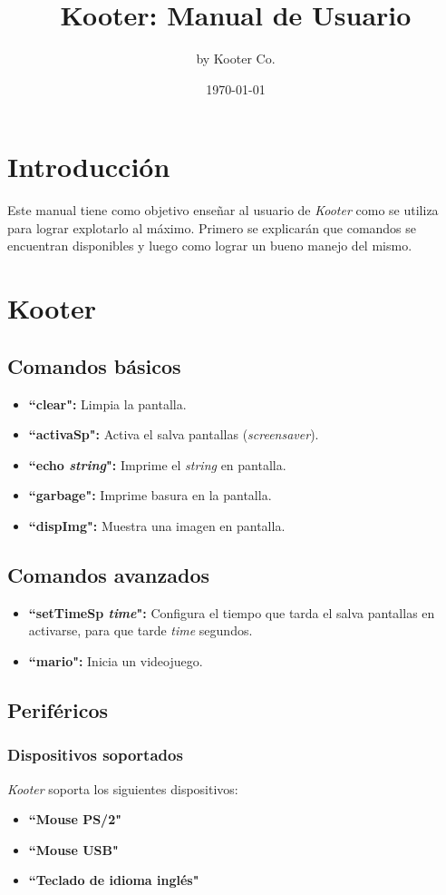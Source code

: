 \documentclass[a4paper,11pt]{article}
\title{Kooter: Manual de Usuario}
\author{by Kooter Co.}
\date{\today}
\begin{document}
\maketitle
\newpage
\tableofcontents
\newpage
\section{Introducción}
Este manual tiene como objetivo enseñar al usuario de \emph{Kooter} como se utiliza para lograr explotarlo al máximo. Primero se explicarán que comandos se encuentran disponibles y luego como lograr un bueno manejo del mismo.

\section{Kooter}
\subsection{Comandos básicos}
\begin{itemize}
	\item \textbf{``clear":} Limpia la pantalla.
	\item \textbf{``activaSp":} Activa el salva pantallas (\emph{screensaver}).
	\item \textbf{``echo \emph{string}":} Imprime el \emph{string} en pantalla.
	\item \textbf{``garbage":} Imprime basura en la pantalla.
	\item \textbf{``dispImg":} Muestra una imagen en pantalla.
	
	
\end{itemize}
\subsection{Comandos avanzados}
\begin{itemize}
	\item \textbf{``setTimeSp \emph{time}":} Configura el tiempo que tarda el salva pantallas en activarse, para que tarde \emph{time} segundos. 
	\item \textbf{``mario":} Inicia un videojuego.
\end{itemize}

\subsection{Periféricos}
\subsubsection{Dispositivos soportados}
\emph{Kooter} soporta los siguientes dispositivos:
\begin{itemize}
	\item \textbf{``Mouse PS/2"} 
	\item \textbf{``Mouse USB"} 
	\item \textbf{``Teclado de idioma inglés"}
\end{itemize}
\end{document}
